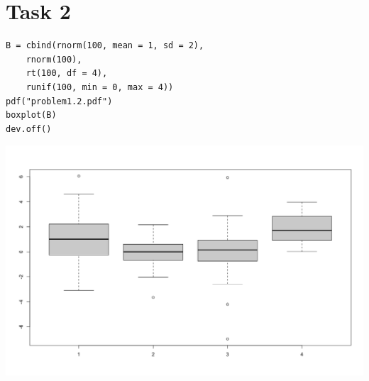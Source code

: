 \documentclass{article}
\begin{document}
	\section*{Task 2}
	\begin{lstlisting}
B = cbind(rnorm(100, mean = 1, sd = 2), 
	rnorm(100), 
	rt(100, df = 4), 
	runif(100, min = 0, max = 4))
pdf("problem1.2.pdf")
boxplot(B)
dev.off()
	\end{lstlisting}
	\begin{center}
		\includegraphics[scale=0.3]{1_2_boxplot}
	\end{center}
	
\end{document}
